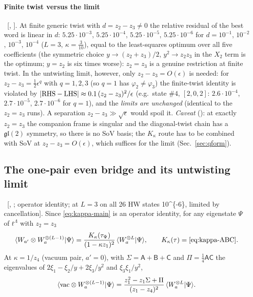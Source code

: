 \paragraph{Finite twist versus the limit} \npy\ [, ]. At finite generic twist with $d=z_2-z_3\ne0$ the relative residual of the best word is linear in $d$:
$5.25\cdot10^{-3}$, $5.25\cdot10^{-4}$, $5.25\cdot10^{-5}$, $5.25\cdot10^{-6}$ for $d=10^{-1}$, $10^{-2}$, $10^{-3}$, $10^{-4}$ ($L=3$, $\kappa=\tfrac3{10}$), equal to the least-squares optimum over all five coefficients (the symmetric choice $y\to(z_2+z_3)/2$, $y^2\to z_2z_3$ in the $X_2$ term is the optimum; $y=z_2$ is six times worse): $z_2=z_3$ is a genuine restriction at finite twist.
In the untwisting limit, however, only $z_2-z_3=O(\epsilon)$ is needed: for $z_2-z_3=\tfrac12\epsilon^q$ with $q=1,2,3$ (so $q=1$ has $\varphi_2\ne\varphi_3$) the finite-twist identity is violated by $|{\rm RHS}-{\rm LHS}|\approx0.1\,(z_2-z_3)^2/\epsilon$ (e.g.\ state $\#4$, $[2,0,2]$: $2.6\cdot10^{-4}$, $2.7\cdot10^{-5}$, $2.7\cdot10^{-6}$ for $q=1$), and the \emph{limits are unchanged}
(identical to the $z_2=z_3$ runs). A separation $z_2-z_3\gg\sqrt\epsilon$ would spoil it.
\emph{Caveat} (): at exactly $z_2=z_3$ the companion frame is singular and the diagonal-twist chain has a $\mathfrak{gl}(2)$ symmetry, so there is no SoV basis; the $K_\kappa$ route has to be combined with SoV at $z_2-z_3=O(\epsilon)$, which suffices for the limit (Sec.~\ref{sec:qform}).

\subsection{The one-pair even bridge and its untwisting limit}\label{sec:kappa-untw}

\ex\ [, ; operator identity; at $L=3$ on all 26 HW states \num{10^{-6}}, limited by cancellation]. Since \eqref{eq:kappa-main} is an operator identity, for any eigenstate $\Psi$ of $t^\Lambda$ with $z_2=z_3$
\begin{equation}\label{eq:kappa-ev}
 \langle W_{a'}\otimes W_a^{\otimes(L-1)}|\Psi\rangle=\frac{K_\kappa(\tau_\Psi)}{(1-\kappa z_1)^2}\,\langle W_a^{\otimes L}|\Psi\rangle,\qquad K_\kappa(\tau)=\text{\eqref{eq:kappa-ABC}}.
\end{equation}
At $\kappa=1/z_4$ (vacuum pair, $a'=0$), with $\Sigma=\mathsf A+\mathsf B+\mathsf C$ and $\Pi=\tfrac14\mathsf A\mathsf C$ the eigenvalues of $2\xi_1-\xi_2/y+2\xi_3/y^2$ and $\xi_3\xi_1/y^2$,
\begin{equation}
 \langle\mathrm{vac}\otimes W_a^{\otimes(L-1)}|\Psi\rangle=\frac{z_1^2-z_1\Sigma+\Pi}{(z_1-z_4)^2}\,\langle W_a^{\otimes L}|\Psi\rangle.
\end{equation}

